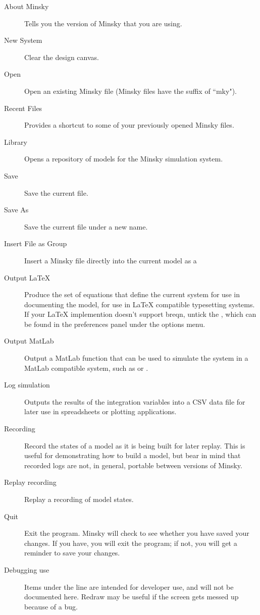 \begin{description}
\item[About Minsky] Tells you the version of Minsky that you are using.

\item[New System] Clear the design canvas.

\item[Open] Open an existing Minsky file (Minsky files have the suffix of ``mky").

\item[Recent Files]\label{recentfiles} Provides a shortcut to some of
your previously opened Minsky files.

\item[Library] Opens a repository of models for the Minsky simulation system.

\item[Save] Save the current file.

\item[Save As] Save the current file under a new name.

\item[Insert File as Group] Insert a Minsky file directly into the
current model as a 

\item[Output LaTeX] Produce the set of equations that define the
  current system for use in documenting the model, for use in LaTeX
  compatible typesetting systems. If your LaTeX implemention doesn't
  support breqn, untick the , which can be found in the preferences panel under the options menu.

\item[Output MatLab] Output a MatLab function that can be used to
simulate the system in a MatLab compatible system, such as
or .

\item[Log simulation] Outputs the results of the integration variables
into a CSV data file for later use in spreadsheets or plotting
applications.

\item[Recording] Record the states of a model as it is being built for later
replay. This is useful for demonstrating how to build a model, but
bear in mind that recorded logs are not, in general, portable between
versions of Minsky.

\item[Replay recording] Replay a recording of model states.

\item[Quit] Exit the program. Minsky will check to see whether you have saved your changes. If you have, you will exit the program; if not, you will get a reminder to save your changes.

\item[Debugging use] Items under the line are intended for developer
  use, and will not be documented here. Redraw may be useful if the
  screen gets messed up because of a bug.

\end{description}

